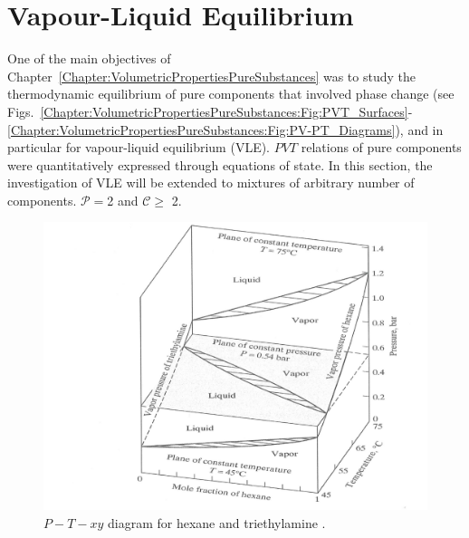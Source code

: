 \section{Vapour-Liquid Equilibrium}\label{Chapter:VLE:Section:VLE}
One of the main objectives of Chapter~\ref{Chapter:VolumetricPropertiesPureSubstances} was to study the thermodynamic equilibrium of pure components that involved phase change (see Figs.~\ref{Chapter:VolumetricPropertiesPureSubstances:Fig:PVT_Surfaces}-\ref{Chapter:VolumetricPropertiesPureSubstances:Fig:PV-PT_Diagrams}), and in particular for vapour-liquid equilibrium (VLE). $PVT$ relations of pure components were quantitatively expressed through equations of state. In this section, the investigation of VLE will be extended to mixtures of arbitrary number of components. \ie $\mathcal{P}=$2 and $\mathcal{C}\ge$ 2.
      \begin{figure}[h]
         \begin{center}
           \includegraphics[width=.9\columnwidth,clip]{./../Pics/PTxy_diagram}
           \vspace{-.1cm}\caption{$P-T-xy$ diagram for hexane and triethylamine \citep[extracted from][]{Sandler_Book}.}\label{Chapter:VLE:Fig:Fig01}
         \end{center}
       \end{figure}

